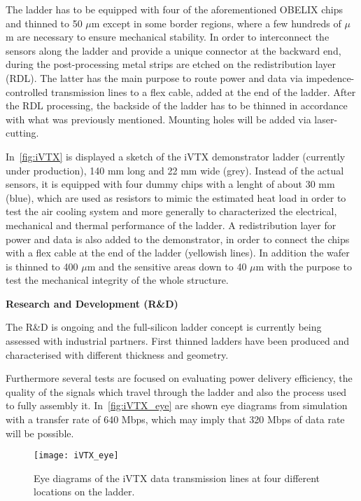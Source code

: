 The ladder has to be equipped with four of the aforementioned OBELIX chips and thinned to 50 $\mu$m except in some border regions, where a few hundreds of $\mu$m are necessary to ensure mechanical stability. 
In order to interconnect the sensors along the ladder and provide a unique connector at the backward end, during the post-processing metal strips are etched on the redistribution layer (RDL). The latter has the main purpose to route power and data via impedence-controlled transmission lines to a flex cable, added at the end of the ladder.
After the RDL processing, the backside of the ladder has to be thinned in accordance with what was previously mentioned. Mounting holes will be added via laser-cutting.


In~\autoref{fig:iVTX} is displayed a sketch of the iVTX demonstrator ladder (currently under production), 140 mm long and 22 mm wide (grey). Instead of the actual sensors, it is equipped with four dummy chips with a lenght of about 30 mm (blue), which are used as resistors to mimic the estimated heat load in order to test the air cooling system and more generally to characterized the electrical, mechanical and thermal performance of the ladder.
A redistribution layer for power and data is also added to the demonstrator, in order to connect the chips with a flex cable at the end of the ladder (yellowish lines). In addition the wafer is thinned to 400 $\mu$m and the sensitive areas down to 40 $\mu$m with the purpose to test the mechanical integrity of the whole structure.

\begin{description}
\item \textbf{Research and Development (R\&D)}
\end{description}

The R\&D is ongoing and the full-silicon ladder concept is currently being assessed with industrial partners. First thinned ladders have been produced and characterised with different thickness and geometry.

Furthermore several tests are focused on evaluating power delivery efficiency, the quality of the signals which travel through the ladder and also the process used to fully assembly it. 
In~\autoref{fig:iVTX_eye} are shown eye diagrams from simulation with a transfer rate of 640 Mbps, which may imply that 320 Mbps of data rate will be possible.

\begin{figure}[h!]
\centering
\texttt{[image: iVTX\_eye]}
\caption{Eye diagrams of the iVTX data transmission lines at four different locations on the ladder.}
\label{fig:iVTX_eye}
\end{figure}


